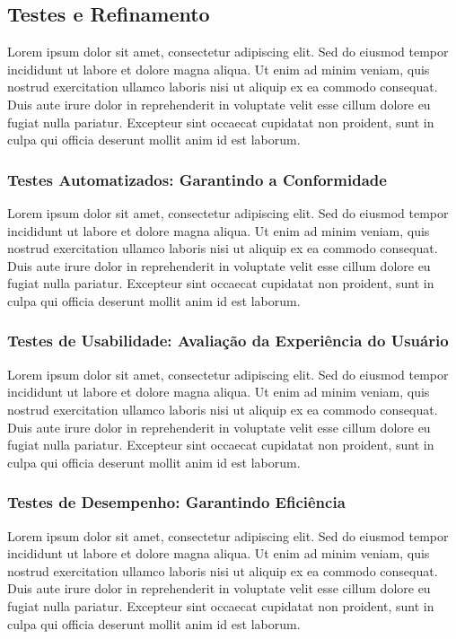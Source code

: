 \documentclass[
	12pt,				    %
	openright,			    %
	oneside,			    %
	a4paper,			    %
    sumario=tradicional,    %
	english,			    %
	brazilian,				    %
	]{abntex2}
\begin{document}
\subsection{Testes e Refinamento}

Lorem ipsum dolor sit amet, consectetur adipiscing elit. Sed do eiusmod tempor incididunt ut labore et dolore magna aliqua. Ut enim ad minim veniam, quis nostrud exercitation ullamco laboris nisi ut aliquip ex ea commodo consequat. Duis aute irure dolor in reprehenderit in voluptate velit esse cillum dolore eu fugiat nulla pariatur. Excepteur sint occaecat cupidatat non proident, sunt in culpa qui officia deserunt mollit anim id est laborum.

\subsubsection{Testes Automatizados: Garantindo a Conformidade}

Lorem ipsum dolor sit amet, consectetur adipiscing elit. Sed do eiusmod tempor incididunt ut labore et dolore magna aliqua. Ut enim ad minim veniam, quis nostrud exercitation ullamco laboris nisi ut aliquip ex ea commodo consequat. Duis aute irure dolor in reprehenderit in voluptate velit esse cillum dolore eu fugiat nulla pariatur. Excepteur sint occaecat cupidatat non proident, sunt in culpa qui officia deserunt mollit anim id est laborum.

\subsubsection{Testes de Usabilidade: Avaliação da Experiência do Usuário}

Lorem ipsum dolor sit amet, consectetur adipiscing elit. Sed do eiusmod tempor incididunt ut labore et dolore magna aliqua. Ut enim ad minim veniam, quis nostrud exercitation ullamco laboris nisi ut aliquip ex ea commodo consequat. Duis aute irure dolor in reprehenderit in voluptate velit esse cillum dolore eu fugiat nulla pariatur. Excepteur sint occaecat cupidatat non proident, sunt in culpa qui officia deserunt mollit anim id est laborum.

\subsubsection{Testes de Desempenho: Garantindo Eficiência}

Lorem ipsum dolor sit amet, consectetur adipiscing elit. Sed do eiusmod tempor incididunt ut labore et dolore magna aliqua. Ut enim ad minim veniam, quis nostrud exercitation ullamco laboris nisi ut aliquip ex ea commodo consequat. Duis aute irure dolor in reprehenderit in voluptate velit esse cillum dolore eu fugiat nulla pariatur. Excepteur sint occaecat cupidatat non proident, sunt in culpa qui officia deserunt mollit anim id est laborum.
\end{document}
